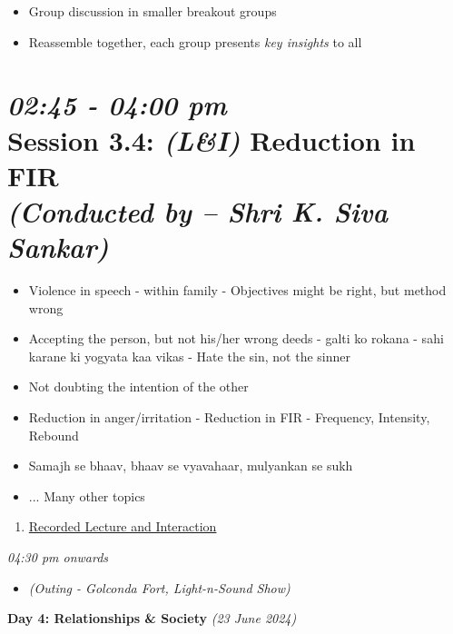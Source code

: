 \documentclass[11pt]{article}
\begin{document}
    \begin{itemize}
        \item Group discussion in smaller breakout groups
        \item Reassemble together, each group presents {\em key insights} to all
    \end{itemize}


    \section*{{\it 02:45 - 04:00 pm} \\
    Session 3.4: {\it (L\&I)} Reduction in FIR \\
    {\Large\it (Conducted by -- Shri K. Siva Sankar)}}

    \begin{itemize}
        \item Violence in speech - within family
        \subitem - Objectives might be right, but method wrong
        \item Accepting the person, but not his/her wrong deeds
        \subitem - galti ko rokana
        \subitem - sahi karane ki yogyata kaa vikas
        \subitem - Hate the sin, not the sinner
        \item Not doubting the intention of the other
        \item Reduction in anger/irritation
        \subitem - Reduction in FIR - Frequency, Intensity, Rebound
        \item Samajh se bhaav, bhaav se vyavahaar, mulyankan se sukh
        \item ... Many other topics
    \end{itemize}

    \begin{enumerate}
        \item \href{https://www.youtube.com/watch?v=2JawzPFHKbg}{Recorded Lecture and Interaction}
    \end{enumerate}

    \noindent
    {\Large\it 04:30 pm onwards}
    \begin{itemize}
        \item[] {\em (Outing - Golconda Fort, Light-n-Sound Show) }
    \end{itemize}


    \begin{center}
        \vspace{10mm}
        {\LARGE {\bf Day 4: Relationships \& Society} {\em (23 June 2024)} }\\
    \end{center}
\end{document}
